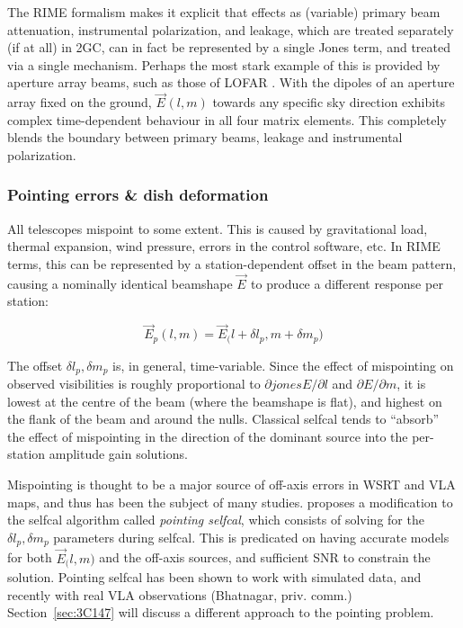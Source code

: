 \documentclass[]{aa}
\newcommand{\jones}[2]{\vec {#1}_{#2}}
\begin{document}
The RIME formalism makes it explicit that effects as (variable) primary beam attenuation, instrumental polarization, and leakage, which are treated separately (if at all) in 2GC, can in fact be represented by a single Jones term, and treated via a single mechanism. Perhaps the most stark example of this is provided by aperture array beams, such as those of LOFAR \citep{Yatawatta:LOFAR-beam}. With the dipoles of an aperture array fixed on the ground, 
$\jones{E}{}(l,m)$ towards any specific sky direction exhibits complex time-dependent behaviour in all four matrix elements. This completely blends the boundary between primary beams, leakage and instrumental polarization.

\subsubsection{Pointing errors \& dish deformation\label{sec:pointing}}

All telescopes mispoint to some extent. This is caused by gravitational load, thermal expansion, wind pressure, errors in the control software, etc. In RIME terms, this can be represented by a station-dependent offset in the beam pattern, causing a nominally identical beamshape $\jones{E}{}$ to produce a different response per station:

\begin{equation}\label{eq:mispointing}
\jones{E}{p}(l,m) = \jones{E}(l+\delta l_p,m+\delta m_p)
\end{equation}

The offset $\delta l_p,\delta m_p$ is, in general, time-variable. Since the effect of mispointing on observed visibilities is roughly proportional to $\partial jonesE/\partial l$ and $\partial E/\partial m$, it is lowest at the centre of the beam (where the beamshape is flat), and highest on the flank of the beam and around the nulls. Classical selfcal tends to  ``absorb'' the effect of mispointing in the direction of the dominant source
into the per-station amplitude gain solutions. 

Mispointing is thought to be a major source of off-axis errors in WSRT and VLA maps, and thus has been the subject of many studies. \citet{SB:pointing} proposes a modification to the selfcal algorithm called {\em pointing selfcal}, which consists of solving for the $\delta l_p,\delta m_p$ parameters during selfcal. This is predicated on having accurate models for both $\jones{E}(l,m)$ and the off-axis sources, and sufficient SNR to constrain the solution. Pointing selfcal has been shown to work with simulated data, and recently with real VLA observations (Bhatnagar, priv. comm.) Section~\ref{sec:3C147} will discuss a different approach to the pointing problem.
\end{document}
